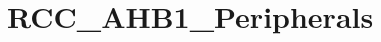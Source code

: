 \hypertarget{group___r_c_c___a_h_b1___peripherals}{\section{R\-C\-C\-\_\-\-A\-H\-B1\-\_\-\-Peripherals}
\label{group___r_c_c___a_h_b1___peripherals}
}

